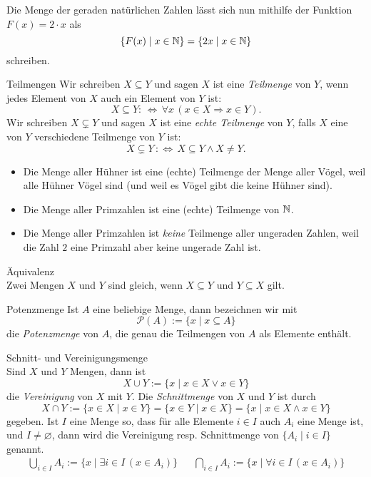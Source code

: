 \begin{example}
    Die Menge der geraden natürlichen Zahlen lässt sich nun mithilfe der Funktion $F(x)=2\cdot x$ als
    \[
        \{F(x)\mid x\in\mathbb{N}\} = \{2x\mid x\in\mathbb{N}\}
    \]
    schreiben.
\end{example}

\begin{definition}{Teilmengen}
    Wir schreiben $X\subseteq Y$ und sagen $X$ ist eine \textit{Teilmenge} von $Y$, wenn jedes Element von $X$ auch ein Element von $Y$ ist:
    \[
        X\subseteq Y:\,\Leftrightarrow\,\forall x\,(x\in X\Rightarrow x\in Y).
    \]
    Wir schreiben $X\subsetneq Y$ und sagen $X$ ist eine \textit{echte Teilmenge} von $Y$, falls $X$ eine von $Y$ verschiedene Teilmenge von $Y$ ist:
    \[
        X\subsetneq Y\,:\Leftrightarrow\, X\subseteq Y\land X\neq Y.
    \]
\end{definition}

\begin{example}
    \begin{itemize}
        \item Die Menge aller Hühner ist eine (echte) Teilmenge der Menge aller Vögel, weil alle Hühner Vögel sind (und weil es Vögel gibt die keine Hühner sind).
        \item Die Menge aller Primzahlen ist eine (echte) Teilmenge von $\mathbb{N}$.
        \item Die Menge aller Primzahlen ist \textit{keine} Teilmenge aller ungeraden Zahlen, weil die Zahl $2$ eine Primzahl aber keine ungerade Zahl ist.
    \end{itemize}
\end{example}

\begin{lemma}{Äquivalenz}\\
    Zwei Mengen $X$ und $Y$ sind gleich, wenn $X\subseteq Y$ und $Y\subseteq X$ gilt.
\end{lemma}

\begin{definition}{Potenzmenge}
    Ist $A$ eine beliebige Menge, dann bezeichnen wir mit
    \[
        \mathcal{P}(A):=\{x\mid x\subseteq A\}
    \]
    die \textit{Potenzmenge} von $A$, die genau die Teilmengen von $A$ als Elemente enthält.
\end{definition}

\begin{definition}{Schnitt- und Vereinigungsmenge}\\
    Sind $X$ und $Y$ Mengen, dann ist
    \[
        X\cup Y:=\{x\mid x\in X\lor x\in Y \}
    \]
    die \textit{Vereinigung} von $X$ mit $Y$. Die \textit{Schnittmenge} von $X$ und $Y$ ist durch
    \[
        X\cap Y:=\{x\in X\mid x\in Y \}=\{x\in Y\mid x\in X\}=\{x\mid x\in X\land x\in Y\}
    \]
    gegeben. Ist $I$ eine Menge so, dass für alle Elemente $i\in I$ auch $A_i$ eine Menge ist, und $I\neq\varnothing$, dann wird die Vereinigung resp. Schnittmenge von $\{A_i\mid i\in I\}$ genannt.
    \begin{align*}
        \bigcup_{i\in I}A_i:=\{x\mid\exists i\in I\,(x\in A_i) \} & & \bigcap_{i\in I}A_i:=\{x\mid\forall i\in I\,(x\in A_i) \}
    \end{align*}
\end{definition}

